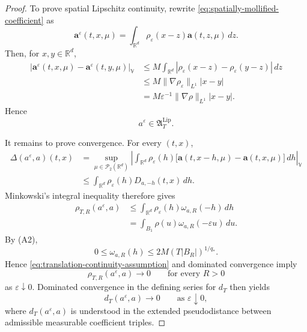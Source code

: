 \documentclass[12pt,oneside, reqno]{amsart}
\numberwithin{equation}{section}
\begin{document}
\begin{proof}
	To prove spatial Lipschitz continuity, rewrite
	\eqref{eq:spatially-mollified-coefficient} as
	\[
	\mathbf a^\varepsilon(t,x,\mu)
	=
	\int_{\mathbb R^d}
	\rho_\varepsilon(x-z)
	\mathbf a(t,z,\mu)\,dz.
	\]
	Then, for \(x,y\in\mathbb R^d\),
	\begin{align}
		\left|
		\mathbf a^\varepsilon(t,x,\mu)
		-
		\mathbf a^\varepsilon(t,y,\mu)
		\right|_{\mathbb V}
		&\leq
		M
		\int_{\mathbb R^d}
		\left|
		\rho_\varepsilon(x-z)
		-
		\rho_\varepsilon(y-z)
		\right|\,dz
		\nonumber\\
		&\leq
		M
		\|\nabla\rho_\varepsilon\|_{L^1}
		|x-y|
		\nonumber\\
		&=
		M\varepsilon^{-1}
		\|\nabla\rho\|_{L^1}
		|x-y|.
		\label{eq:mollified-spatial-lipschitz}
	\end{align}
	Hence
	\[
	a^\varepsilon
	\in
	\mathfrak A_T^{\mathrm{Lip}}.
	\]
	
	It remains to prove convergence. For every \((t,x)\),
	\begin{align}
		\Delta(a^\varepsilon,a)(t,x)
		&=
		\sup_{\mu\in\mathcal P_2(\mathbb R^d)}
		\left|
		\int_{\mathbb R^d}
		\rho_\varepsilon(h)
		\bigl[
		\mathbf a(t,x-h,\mu)
		-
		\mathbf a(t,x,\mu)
		\bigr]\,dh
		\right|_{\mathbb V}
		\nonumber\\
		&\leq
		\int_{\mathbb R^d}
		\rho_\varepsilon(h)
		D_{a,-h}(t,x)\,dh.
		\label{eq:mollified-error-pointwise}
	\end{align}
	Minkowski's integral inequality therefore gives
	\begin{align}
		\rho_{T,R}(a^\varepsilon,a)
		&\leq
		\int_{\mathbb R^d}
		\rho_\varepsilon(h)
		\omega_{a,R}(-h)\,dh
		\nonumber\\
		&=
		\int_{B_1}
		\rho(u)
		\omega_{a,R}(-\varepsilon u)\,du.
		\label{eq:mollified-error-minkowski}
	\end{align}
	By \textnormal{(A2)},
	\[
	0
	\leq
	\omega_{a,R}(h)
	\leq
	2M(T|B_R|)^{1/q_\ast}.
	\]
	Hence
	\eqref{eq:translation-continuity-assumption} and dominated
	convergence imply
	\[
	\rho_{T,R}(a^\varepsilon,a)
	\longrightarrow0
	\qquad
	\text{for every }R>0
	\]
	as \(\varepsilon\downarrow0\).
	Dominated convergence in the defining series for \(d_T\) then yields
	\begin{equation}
		\label{eq:mollified-coefficient-convergence}
		d_T(a^\varepsilon,a)
		\longrightarrow0
		\qquad
		\text{as }\varepsilon\downarrow0,
	\end{equation}
	where \(d_T(a^\varepsilon,a)\) is understood in the extended
	pseudodistance between admissible measurable coefficient triples.
	

\end{proof}
\end{document}
